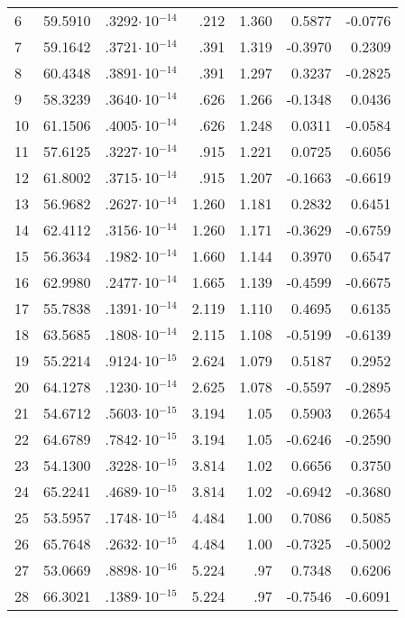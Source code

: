{\begin{longtable}{|l||r|r|r|r|r|r|}
6  & 59.5910 & .3292$\cdot$\,10$^{-14}$ & .212 & 1.360 & 0.5877 & -0.0776 \\
7  & 59.1642 & .3721$\cdot$\,10$^{-14}$ & .391 & 1.319 & -0.3970 & 0.2309 \\
8  & 60.4348 & .3891$\cdot$\,10$^{-14}$ & .391 & 1.297 & 0.3237 & -0.2825 \\
9  & 58.3239 & .3640$\cdot$\,10$^{-14}$ & .626 & 1.266 & -0.1348 &  0.0436 \\
10 & 61.1506 & .4005$\cdot$\,10$^{-14}$ & .626 & 1.248 & 0.0311 & -0.0584 \\
11 & 57.6125 & .3227$\cdot$\,10$^{-14}$ & .915 & 1.221 & 0.0725 & 0.6056 \\
12 & 61.8002 & .3715$\cdot$\,10$^{-14}$ & .915 & 1.207 & -0.1663 & -0.6619 \\
13 & 56.9682 & .2627$\cdot$\,10$^{-14}$ & 1.260 & 1.181 & 0.2832 & 0.6451 \\
14 & 62.4112 & .3156$\cdot$\,10$^{-14}$ & 1.260 & 1.171 & -0.3629 & -0.6759 \\
15 & 56.3634 & .1982$\cdot$\,10$^{-14}$ & 1.660 & 1.144 & 0.3970 &  0.6547 \\
16 & 62.9980 & .2477$\cdot$\,10$^{-14}$ & 1.665 & 1.139 & -0.4599 & -0.6675 \\
17 & 55.7838 & .1391$\cdot$\,10$^{-14}$ & 2.119 & 1.110 & 0.4695 & 0.6135 \\
18 & 63.5685 & .1808$\cdot$\,10$^{-14}$ & 2.115 & 1.108 & -0.5199 & -0.6139 \\
19 & 55.2214 & .9124$\cdot$\,10$^{-15}$ & 2.624 & 1.079 & 0.5187 & 0.2952 \\
20 & 64.1278 & .1230$\cdot$\,10$^{-14}$ & 2.625 & 1.078 & -0.5597 & -0.2895 \\
21 & 54.6712 & .5603$\cdot$\,10$^{-15}$ & 3.194 & 1.05 & 0.5903 & 0.2654 \\
22 & 64.6789 & .7842$\cdot$\,10$^{-15}$ & 3.194 & 1.05 & -0.6246 & -0.2590 \\
23 & 54.1300 & .3228$\cdot$\,10$^{-15}$ & 3.814 & 1.02 & 0.6656 & 0.3750 \\
24 & 65.2241 & .4689$\cdot$\,10$^{-15}$ & 3.814 & 1.02 & -0.6942 & -0.3680 \\
25 & 53.5957 & .1748$\cdot$\,10$^{-15}$ & 4.484 & 1.00 & 0.7086 & 0.5085 \\
26 & 65.7648 & .2632$\cdot$\,10$^{-15}$ & 4.484 & 1.00 & -0.7325 & -0.5002 \\
27 & 53.0669 & .8898$\cdot$\,10$^{-16}$ & 5.224 & .97 & 0.7348 & 0.6206 \\
28 & 66.3021 & .1389$\cdot$\,10$^{-15}$ & 5.224 & .97 & -0.7546 & -0.6091 \\

\end{longtable}}
